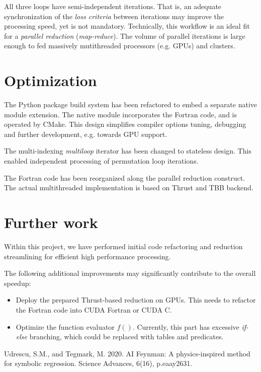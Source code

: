 \documentclass[peerreview]{IEEEtran}
\begin{document}
All three loops have semi-independent iterations. That is, an adequate synchronization of the \emph{loss criteria} between iterations may improve the processing speed, yet is not mandatory. Technically, this workflow is an ideal fit for a \emph{parallel reduction} (\emph{map-reduce}). The volume of parallel iterations is large enough to fed massively mutithreaded processors (e.g. GPUs) and clusters.

\section{Optimization}

The Python package build system has been refactored to embed a separate native module extension. The native module incorporates the Fortran code, and is operated by CMake. This design simplifies compiler options tuning, debugging and further development, e.g. towards GPU support.

The multi-indexing \emph{multiloop} iterator has been changed to stateless design. This enabled independent processing of permutation loop iterations.

The Fortran code has been reorganized along the parallel reduction construct. The actual multithreaded implementation is based on Thrust and TBB backend.

\section{Further work}

Within this project, we have performed initial code refactoring and reduction streamlining for efficient high performance processing.

The following additional improvements may significantly contribute to the overall speedup:

\begin{itemize}
\item Deploy the prepared Thrust-based reduction on GPUs. This needs to refactor the Fortran code into CUDA Fortran or CUDA C.
\item Optimize the function evaluator $f()$. Currently, this part has excessive \emph{if-else} branching, which could be replaced with tables and predicates.
\end{itemize}

\begin{thebibliography}{1}
Udrescu, S.M., and Tegmark, M. 2020. AI Feynman: A physics-inspired method for symbolic regression. Science Advances, 6(16), p.eaay2631.
\end{thebibliography}
\end{document}
